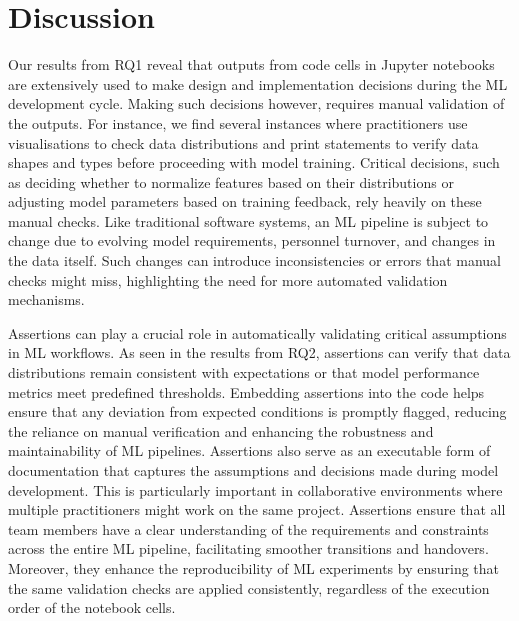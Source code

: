 \section{Discussion}\label{sec:discuss}

Our results from RQ1 reveal that outputs from code cells in Jupyter notebooks are extensively used to make design and implementation decisions during the ML development cycle. Making such decisions however, requires manual validation of the outputs. For instance, we find several instances where practitioners use visualisations to check data distributions and print statements to verify data shapes and types before proceeding with model training. Critical decisions, such as deciding whether to normalize features based on their distributions or adjusting model parameters based on training feedback, rely heavily on these manual checks. Like traditional software systems, an ML pipeline is subject to change due to evolving model requirements, personnel turnover, and changes in the data itself. Such changes can introduce inconsistencies or errors that manual checks might miss, highlighting the need for more automated validation mechanisms. 

Assertions can play a crucial role in automatically validating critical assumptions in ML workflows. As seen in the results from RQ2, assertions can verify that data distributions remain consistent with expectations or that model performance metrics meet predefined thresholds. Embedding assertions into the code helps ensure that any deviation from expected conditions is promptly flagged, reducing the reliance on manual verification and enhancing the robustness and maintainability of ML pipelines. Assertions also serve as an executable form of documentation that captures the assumptions and decisions made during model development. This is particularly important in collaborative environments where multiple practitioners might work on the same project. Assertions ensure that all team members have a clear understanding of the requirements and constraints across the entire ML pipeline, facilitating smoother transitions and handovers. Moreover, they enhance the reproducibility of ML experiments by ensuring that the same validation checks are applied consistently, regardless of the execution order of the notebook cells.


